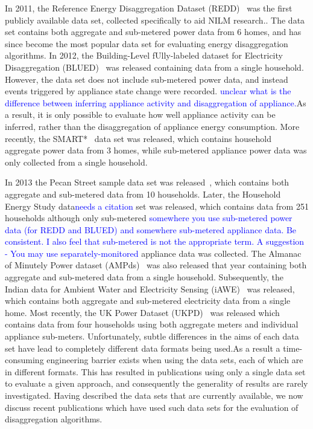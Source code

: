 \documentclass{sig-alternate}
\newcommand{\bluecolor}[1]{\textcolor{blue}{#1}}
\begin{document}
In 2011, the Reference Energy Disaggregation Dataset (REDD)~\cite{redd} was the first publicly available data set, collected specifically to aid NILM research.. The data set contains both aggregate and sub-metered power data from 6 homes, and has since become the most popular data set for evaluating energy disaggregation algorithms. In 2012, the Building-Level fUlly-labeled dataset for Electricity Disaggregation (BLUED)~\cite{blued} was released containing data from a single household. However, the data set does not include sub-metered power data, and instead events triggered by appliance state change were recorded. \bluecolor{unclear what is the difference between inferring appliance activity and disaggregation of appliance.}As a result, it is only possible to evaluate how well appliance activity can be inferred, rather than the disaggregation of appliance energy consumption. More recently, the SMART*~\cite{smart} data set was released, which contains household aggregate power data from 3 homes, while sub-metered appliance power data was only collected from a single household.

In 2013 the Pecan Street sample data set was released~\cite{pecan}, which contains both aggregate and sub-metered data from 10 households. Later, the Household Energy Study data\bluecolor{needs a citation} set was released, which contains data from 251 households although only sub-metered \bluecolor{somewhere you use sub-metered power data (for REDD and BLUED) and somewhere sub-metered appliance data. Be consistent. I also feel that sub-metered is not the appropriate term. A suggestion - You may use separately-monitored }appliance data was collected. The Almanac of Minutely Power dataset (AMPds)~\cite{ampds} was also released that year containing both aggregate and sub-metered data from a single household. Subsequently, the Indian data for Ambient Water and Electricity Sensing (iAWE)~\cite{iawe} was released, which contains both aggregate and sub-metered electricity data from a single home. Most recently, the UK Power Dataset (UKPD)~\cite{ukpd} was released which contains data from four households using both aggregate meters and individual appliance sub-meters. Unfortunately, subtle differences in the aims of each data set have lead to completely different data formats being used.As a result a time-consuming engineering barrier exists when using the data sets, each of which are in different formats. This has resulted in publications using only a single data set to evaluate a given approach, and consequently the generality of results are rarely investigated. Having described the data sets that are currently available, we now discuss recent publications which have used such data sets for the evaluation of disaggregation algorithms.
\end{document}
